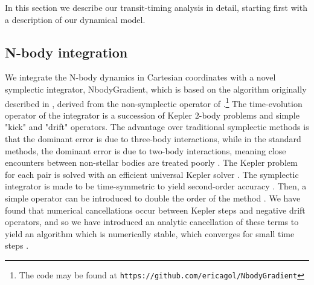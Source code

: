 \documentclass[fleqn,usenatbib]{mnras} %
\begin{document}
In this section we describe our transit-timing analysis in detail, starting first with a description of our dynamical model.




\subsection{N-body integration}

We integrate the N-body dynamics in Cartesian coordinates with a novel symplectic 
integrator, \textsf{NbodyGradient}, which is based on the algorithm originally described in \cite{Hernandez2015}, derived from the non-symplectic operator of \cite{GoncalvesFerrari2014}.\footnote{The code may be found at 
\texttt{https://github.com/ericagol/NbodyGradient}}  The time-evolution operator of the integrator is a succession of Kepler $2$-body problems and simple "kick" and "drift" operators.  %
The advantage over traditional symplectic methods \citep{Wisdom1991} is that the dominant error is due to three-body interactions, while in the standard methods, the dominant error is due to two-body interactions, meaning close encounters between non-stellar bodies are treated poorly \citep{Hernandez2017}.    The Kepler problem
for each pair is solved with an efficient universal Kepler solver \citep{Wisdom2015}.
The symplectic integrator is made to be time-symmetric to yield second-order
accuracy \citep{Hernandez2015}.  Then, a simple operator can be introduced to double the order of the method \citep{Dehnen2017}.
We have found that numerical cancellations occur between Kepler steps
and negative drift operators, and so we have introduced an analytic cancellation
of these terms to yield an algorithm which is numerically stable,
which converges for small time steps \citep{Agol2020}.
\end{document}
